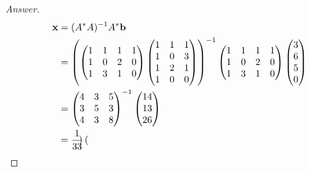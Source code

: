 \documentclass[../psets.tex]{subfiles}
\begin{document}
\begin{enumerate}[label={\textbf{4.\arabic*.}}]
\begin{enumerate}
\begin{proof}[Answer]
\begin{align*}
                \mathbf{x} &= (A^*A)^{-1}A^*\mathbf{b}\\
                &= \left(
                    \begin{pmatrix}
                        1 & 1 & 1 & 1\\
                        1 & 0 & 2 & 0\\
                        1 & 3 & 1 & 0\\
                    \end{pmatrix}
                    \begin{pmatrix}
                        1 & 1 & 1\\
                        1 & 0 & 3\\
                        1 & 2 & 1\\
                        1 & 0 & 0\\
                    \end{pmatrix}
                \right)^{-1}
                \begin{pmatrix}
                    1 & 1 & 1 & 1\\
                    1 & 0 & 2 & 0\\
                    1 & 3 & 1 & 0\\
                \end{pmatrix}
                \begin{pmatrix}
                    3\\
                    6\\
                    5\\
                    0\\
                \end{pmatrix}\\
                &= 
                \begin{pmatrix}
                    4 & 3 & 5\\
                    3 & 5 & 3\\
                    4 & 3 & 8\\
                \end{pmatrix}^{-1}
                \begin{pmatrix}
                    14\\
                    13\\
                    26\\
                \end{pmatrix}\\
                &= \frac{1}{33}
                \begin{pmatrix}

\end{pmatrix}
\end{align*}
\end{proof}
\end{enumerate}
\end{enumerate}
\end{document}
